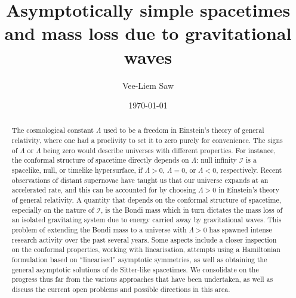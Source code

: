 \documentclass[aps,pre,preprint,superscriptaddress,showpacs,showkeys]{revtex4-1}
\begin{document}

\title{Asymptotically simple spacetimes and mass loss due to gravitational waves}


\author{Vee-Liem Saw}


\date{\today}

\begin{abstract}
The cosmological constant $\Lambda$ used to be a freedom in Einstein's theory of general relativity, where one had a proclivity to set it to zero purely for convenience. The signs of $\Lambda$ or $\Lambda$ being zero would describe universes with different properties. For instance, the conformal structure of spacetime directly depends on $\Lambda$: null infinity $\mathcal{I}$ is a spacelike, null, or timelike hypersurface, if $\Lambda>0$, $\Lambda=0$, or $\Lambda<0$, respectively. Recent observations of distant supernovae have taught us that our universe expands at an accelerated rate, and this can be accounted for by choosing $\Lambda>0$ in Einstein's theory of general relativity. A quantity that depends on the conformal structure of spacetime, especially on the nature of $\mathcal{I}$, is the Bondi mass which in turn dictates the mass loss of an isolated gravitating system due to energy carried away by gravitational waves. This problem of extending the Bondi mass to a universe with $\Lambda>0$ has spawned intense research activity over the past several years. Some aspects include a closer inspection on the conformal properties, working with linearisation, attempts using a Hamiltonian formulation based on ``linearised'' asymptotic symmetries, as well as obtaining the general asymptotic solutions of de Sitter-like spacetimes. We consolidate on the progress thus far from the various approaches that have been undertaken, as well as discuss the current open problems and possible directions in this area.\end{abstract}
\end{document}
